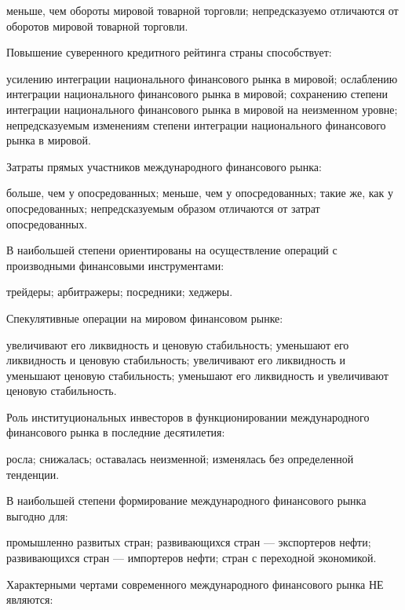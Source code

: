 \documentclass[12pt, table]{exam}
\begin{document}
\begin{questions}
\begin{multicols}{2}
\begin{choices}
	 \CC меньше, чем обороты мировой товарной торговли;
	 \choice непредсказуемо отличаются от оборотов мировой товарной торговли.
	 \end{choices}
\question Повышение суверенного кредитного рейтинга страны способствует:
	 \begin{choices}
	 \choice усилению интеграции национального финансового рынка в мировой;
	 \choice ослаблению интеграции национального финансового рынка в мировой;
	 \choice сохранению степени интеграции национального финансового рынка в мировой на неизменном уровне;
	 \CC непредсказуемым изменениям степени интеграции национального финансового рынка в мировой.
	 \end{choices}
\question Затраты прямых участников международного финансового рынка:
	 \begin{choices}
	 \CC больше, чем у опосредованных;
	 \choice меньше, чем у опосредованных;
	 \choice такие же, как у опосредованных;
	 \choice непредсказуемым образом отличаются от затрат опосредованных.
	 \end{choices}
\question В наибольшей степени ориентированы на осуществление операций с производными финансовыми инструментами:
	 \begin{choices}
	 \CC трейдеры;
	 \choice арбитражеры;
	 \choice  посредники;
	 \choice хеджеры.
	 \end{choices}
\question Спекулятивные операции на мировом финансовом рынке:
	 \begin{choices}
	 \choice увеличивают его ликвидность и ценовую стабильность;
	 \choice уменьшают его ликвидность и ценовую стабильность;
	 \CC увеличивают его ликвидность и уменьшают ценовую стабильность;
	 \choice уменьшают его ликвидность и увеличивают ценовую стабильность.
	 \end{choices}
\question Роль институциональных инвесторов в функционировании международного финансового рынка в последние десятилетия:
	 \begin{choices}
	 \choice росла;
	 \choice снижалась;
	 \choice оставалась неизменной;
	 \CC изменялась без определенной тенденции.
	 \end{choices}
\question В наибольшей степени формирование международного финансового рынка выгодно для:
	 \begin{choices}
	 \CC промышленно развитых стран;
	 \choice развивающихся стран — экспортеров нефти;
	 \choice развивающихся стран — импортеров нефти;
	 \choice стран с переходной экономикой.
	 \end{choices}
\question Характерными чертами современного международного финансового рынка НЕ являются:

\end{multicols}
\end{questions}
\end{document}
